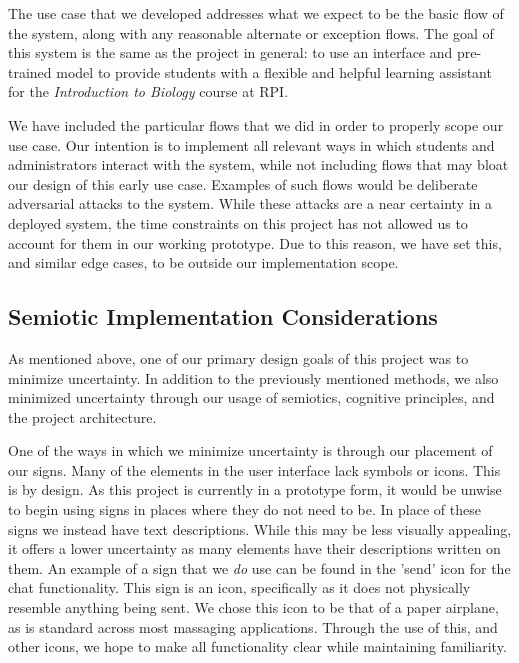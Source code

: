\documentclass[12pt,a4paper]{article}
\begin{document}
    The use case that we developed addresses what we expect to be the basic flow of the system, along
    with any reasonable alternate or exception flows.  The goal of this system is the same as the
    project in general: to use an interface and pre-trained model to provide students with a flexible
    and helpful learning assistant for the \textit{Introduction to Biology} course at RPI.

    We have included the particular flows that we did in order to properly scope our use case.  Our intention
    is to implement all relevant ways in which students and administrators interact with the system,
    while not including flows that may bloat our design of this early use case.  Examples
    of such flows would be deliberate adversarial attacks to the system.  While these attacks are a
    near certainty in a deployed system, the time constraints on this project has not allowed us to
    account for them in our working prototype. Due to this reason, we have set this, and similar
    edge cases, to be outside our implementation scope.

    \subsection{Semiotic Implementation Considerations}

    As mentioned above, one of our primary design goals of this project was to minimize uncertainty.
    In addition to the previously mentioned methods, we also minimized uncertainty through our
    usage of semiotics, cognitive principles, and the project architecture.

    One of the ways in which we minimize uncertainty is through our placement of our signs.  Many
    of the elements in the user interface lack symbols or icons.  This is by design.  As this project
    is currently in a prototype form, it would be unwise to begin using signs in places where they do
    not need to be.  In place of these signs we instead have text descriptions.  While this may be
    less visually appealing, it offers a lower uncertainty as many elements have their descriptions
    written on them.  An example of a sign that we \textit{do} use can be found in the 'send' icon for the
    chat functionality.  This sign is an icon, specifically as it does not physically resemble anything
    being sent.  We chose this icon to be that of a paper airplane, as is standard across most
    massaging applications.  Through the use of this, and other icons, we hope to make all functionality
    clear while maintaining familiarity.
\end{document}

